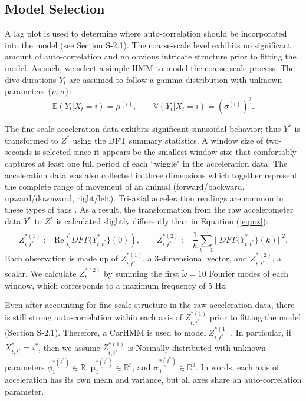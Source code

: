 \subsection{Model Selection}

A lag plot is used to determine where auto-correlation should be incorporated into the model (see Section S-2.1). The coarse-scale level exhibits no significant amount of auto-correlation and no obvious intricate structure prior to fitting the model. As such, we select a simple HMM to model the coarse-scale process. The dive durations $Y_t$ are assumed to follow a gamma distribution with unknown parameters $\{\mu,\sigma\}$:
%
$$\mathbb{E}(Y_t|X_t = i) = \mu^{(i)}, \qquad \mathbb{V}(Y_t|X_t = i) = \left(\sigma^{(i)}\right)^2.$$

The fine-scale acceleration data exhibits significant sinusoidal behavior; thus $Y^*$ is transformed to $Z^*$ using the DFT summary statistics. A window size of two-seconds is selected since it appears be the smallest window size that comfortably captures at least one full period of each ``wiggle" in the acceleration data. The acceleration data was also collected in three dimensions which together represent the complete range of movement of an animal (forward/backward, upward/downward, right/left). Tri-axial acceleration readings are common in these types of tags \citep{Cade:2017,Fehlmann:2017,Wright:2017}. As a result, the transformation from the raw accelerometer data $Y^*$ to $Z^*$ is calculated slightly differently than in Equation (\ref{eqn:z}):
%
\begin{equation*}
    Z_{t,t^*}^{*(1)} := \text{Re}\left(DFT\{Y^*_{t,t^*}\}(0)\right), \qquad Z_{t,t^*}^{*(2)} := \frac{1}{h}\sum_{k=1}^{\tilde{\omega}}\bigg|\bigg|DFT\{Y^*_{t,t^*}\}(k)\bigg|\bigg|^2.
\end{equation*}
%
Each observation is made up of $Z_{t,t^*}^{*(1)}$, a 3-dimensional vector, and $Z_{t,t^*}^{*(2)}$, a scalar. We calculate $Z_t^{*(2)}$ by summing the first $\tilde \omega = 10$ Fourier modes of each window, which corresponds to a maximum frequency of 5 Hz. 

Even after accounting for fine-scale structure in the raw acceleration data, there is still strong auto-correlation within each axis of $Z^{*(1)}_{t,t^*}$ prior to fitting the model (Section S-2.1). Therefore, a CarHMM is used to model $Z^{*(1)}_{t,t^*}$. In particular, if $X^*_{t,t^*} = i^*$, then we assume $Z^{*(1)}_{t,t^*}$ is Normally distributed with unknown parameters $\phi_1^{*(i^*)} \in \mathbb{R}$, $\mathbf{\mu}_1^{*(i^*)} \in \mathbb{R}^3$, and $\mathbf{\sigma}_1^{*(i^*)} \in \mathbb{R}^3$. In words, each axis of acceleration has its own mean and variance, but all axes share an auto-correlation parameter.
%
%


